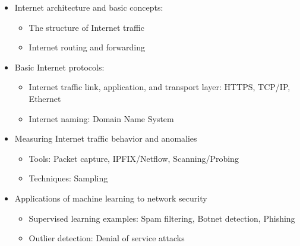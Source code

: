 \documentclass[12pt]{article}
\renewcommand{\_}{\kern-1.5pt\textunderscore\kern-1.5pt}
\begin{document}
\begin{itemize}
	\item Internet architecture and basic concepts:\par

\begin{itemize}
	\item The structure of Internet traffic\par

	\item Internet routing and forwarding\par


\end{itemize}
	\item Basic Internet protocols:\par

\begin{itemize}
	\item Internet traffic link, application, and transport layer: HTTPS, TCP/IP, Ethernet\par

	\item Internet naming: Domain Name System\par


\end{itemize}
	\item Measuring Internet traffic behavior and anomalies\par

\begin{itemize}
	\item Tools: Packet capture, IPFIX/Netflow, Scanning/Probing\par

	\item Techniques: Sampling\par


\end{itemize}
	\item Applications of machine learning to network security\par

\begin{itemize}
	\item Supervised learning examples: Spam filtering, Botnet detection, Phishing\par

	\item Outlier detection: Denial of service attacks
\end{itemize}
\end{itemize}\par
\end{document}
